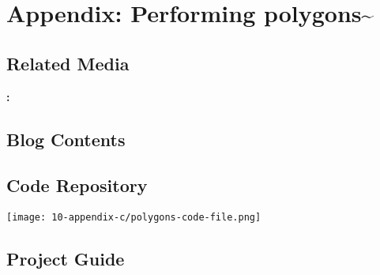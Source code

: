 \chapter{Appendix: Performing polygons\textasciitilde{}}

\section{Related Media}
\noindent \textbf{ :}        \url{}

\section{Blog Contents}

\section{Code Repository}
\texttt{[image: 10-appendix-c/polygons-code-file.png]}

\section{Project Guide}